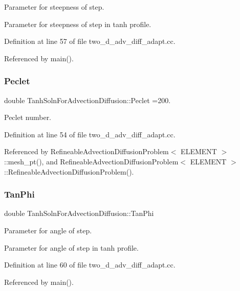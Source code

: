 Parameter for steepness of step. 

Parameter for steepness of step in tanh profile. 

Definition at line 57 of file two\+\_\+d\+\_\+adv\+\_\+diff\+\_\+adapt.\+cc.



Referenced by main().

\mbox{\label{namespaceTanhSolnForAdvectionDiffusion_aeba486af70e92ab7eec1da3ce44d51ee}} 
\subsubsection{\texorpdfstring{Peclet}{Peclet}}
{\footnotesize\ttfamily double Tanh\+Soln\+For\+Advection\+Diffusion\+::\+Peclet =200.}



Peclet number. 



Definition at line 54 of file two\+\_\+d\+\_\+adv\+\_\+diff\+\_\+adapt.\+cc.



Referenced by Refineable\+Advection\+Diffusion\+Problem$<$ E\+L\+E\+M\+E\+N\+T $>$\+::mesh\+\_\+pt(), and Refineable\+Advection\+Diffusion\+Problem$<$ E\+L\+E\+M\+E\+N\+T $>$\+::\+Refineable\+Advection\+Diffusion\+Problem().

\mbox{\label{namespaceTanhSolnForAdvectionDiffusion_a236bf82c661189623706b7c9d9b0c52f}} 
\subsubsection{\texorpdfstring{Tan\+Phi}{TanPhi}}
{\footnotesize\ttfamily double Tanh\+Soln\+For\+Advection\+Diffusion\+::\+Tan\+Phi}



Parameter for angle of step. 

Parameter for angle of step in tanh profile. 

Definition at line 60 of file two\+\_\+d\+\_\+adv\+\_\+diff\+\_\+adapt.\+cc.



Referenced by main().

